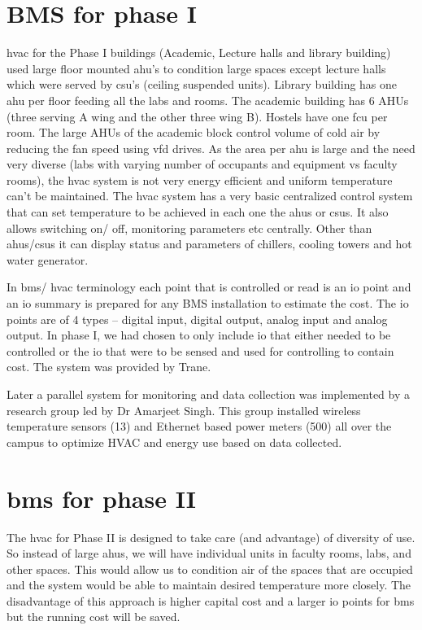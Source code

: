 \documentclass[letterpaper,11pt]{report}
\begin{document}
\section{BMS for phase I}
\ac{hvac} for the Phase I buildings (Academic, Lecture halls and library building) used large floor mounted \ac{ahu}'s to condition large spaces except lecture halls which were served by \ac{csu}'s (ceiling suspended units). Library building has one \ac{ahu} per floor feeding all the labs and rooms. The academic building has 6 AHUs (three serving A wing and the other three wing B). Hostels have one \ac{fcu} per room. The large AHUs of the academic block control volume of cold air by reducing the fan speed using \ac{vfd} drives. As the area per \ac{ahu} is large and the need very diverse (labs with varying number of occupants and equipment vs faculty rooms), the \ac{hvac} system is not very energy efficient and uniform temperature can't be maintained. The \ac{hvac} system has a very basic centralized control system that can set temperature to be achieved in each one the \ac{ahu}s or \ac{csu}s. It also allows switching on/ off, monitoring parameters etc centrally. Other than \ac{ahu}s/\ac{csu}s it can display status and parameters of chillers, cooling towers and hot water generator.
\par
In \ac{bms}/ \ac{hvac} terminology each point that is controlled or read is an \ac{io} point and an \ac{io} summary is prepared for any BMS installation to estimate the cost. The \ac{io} points are of 4 types –  digital input, digital output, analog input and analog output. In phase I, we had chosen to only include \ac{io} that either needed to be controlled or the \ac{io} that were to be sensed and used for controlling to contain cost. The system was provided by Trane.
\par
Later a parallel system for monitoring and data collection was implemented by a research group led by Dr Amarjeet Singh. This group installed wireless temperature sensors (13) and Ethernet based power meters (500) all over the campus to optimize HVAC and energy use based on data collected.
\pagebreak
\section{\ac{bms} for phase II}
The \ac{hvac} for Phase II is designed to take care (and advantage) of diversity of use. So instead of large \ac{ahu}s, we will have individual units in faculty rooms, labs, and other spaces. This would allow us to condition air of the spaces that are occupied and the system would be able to maintain desired temperature more closely. The disadvantage of this approach is higher capital cost and a larger \ac{io} points for \ac{bms} but the running cost will be saved.
\end{document}
